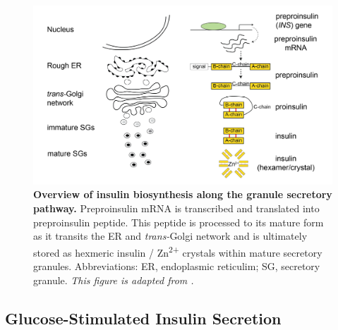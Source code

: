 \begin{figure}[t]
    \centering
    \includegraphics[width=\linewidth]{Chapter1/Fig/F1-9-01.png}
    \caption[Overview of insulin biosynthesis]{\textbf{Overview of insulin biosynthesis along the granule secretory pathway.} Preproinsulin mRNA is transcribed and translated into preproinsulin peptide. This peptide is processed to its mature form as it transits the ER and \textit{trans-}Golgi network and is ultimately stored as hexmeric insulin / Zn\textsuperscript{2+} crystals within mature secretory granules. Abbreviations: ER, endoplasmic reticulim; SG, secretory granule. \textit{This figure is adapted from \textbf{\cite{tokarz_cell_2018}}.}}
    \label{fig:chp1_ins_bio}
\end{figure}

\subsection{Glucose-Stimulated Insulin Secretion} %
\label{sec:gsis}

